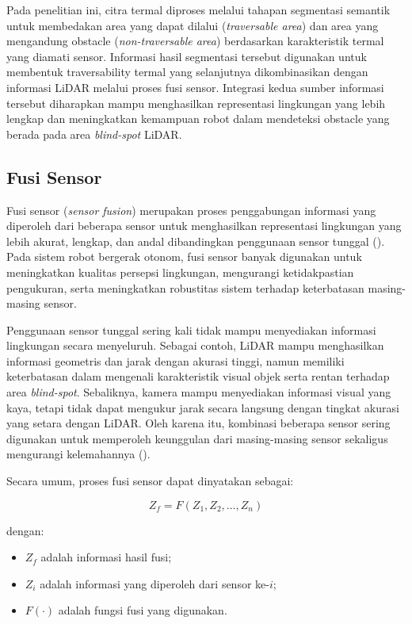 Pada penelitian ini, citra termal diproses melalui tahapan segmentasi semantik untuk membedakan area yang dapat dilalui (\textit{traversable area}) dan area yang mengandung obstacle (\textit{non-traversable area}) berdasarkan karakteristik termal yang diamati sensor. Informasi hasil segmentasi tersebut digunakan untuk membentuk traversability termal yang selanjutnya dikombinasikan dengan informasi LiDAR melalui proses fusi sensor. Integrasi kedua sumber informasi tersebut diharapkan mampu menghasilkan representasi lingkungan yang lebih lengkap dan meningkatkan kemampuan robot dalam mendeteksi obstacle yang berada pada area \textit{blind-spot} LiDAR.
\subsection{Fusi Sensor}

Fusi sensor (\textit{sensor fusion}) merupakan proses penggabungan informasi yang diperoleh dari beberapa sensor untuk menghasilkan representasi lingkungan yang lebih akurat, lengkap, dan andal dibandingkan penggunaan sensor tunggal (\cite{Khaleghi2013}). Pada sistem robot bergerak otonom, fusi sensor banyak digunakan untuk meningkatkan kualitas persepsi lingkungan, mengurangi ketidakpastian pengukuran, serta meningkatkan robustitas sistem terhadap keterbatasan masing-masing sensor.

Penggunaan sensor tunggal sering kali tidak mampu menyediakan informasi lingkungan secara menyeluruh. Sebagai contoh, LiDAR mampu menghasilkan informasi geometris dan jarak dengan akurasi tinggi, namun memiliki keterbatasan dalam mengenali karakteristik visual objek serta rentan terhadap area \textit{blind-spot}. Sebaliknya, kamera mampu menyediakan informasi visual yang kaya, tetapi tidak dapat mengukur jarak secara langsung dengan tingkat akurasi yang setara dengan LiDAR. Oleh karena itu, kombinasi beberapa sensor sering digunakan untuk memperoleh keunggulan dari masing-masing sensor sekaligus mengurangi kelemahannya (\cite{Khaleghi2013,Choi2023}).

Secara umum, proses fusi sensor dapat dinyatakan sebagai:

\begin{equation}
Z_f = F(Z_1,Z_2,\dots,Z_n)
\label{eq:sensor_fusion}
\end{equation}

dengan:

\begin{itemize}
\item $Z_f$ adalah informasi hasil fusi;
\item $Z_i$ adalah informasi yang diperoleh dari sensor ke-$i$;
\item $F(\cdot)$ adalah fungsi fusi yang digunakan.
\end{itemize}

